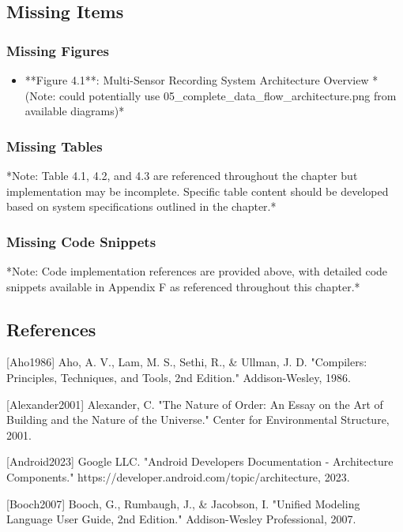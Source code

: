 \documentclass[12pt,a4paper]{article}
\begin{document}
\subsection{Missing Items}

\subsubsection{Missing Figures}

\begin{itemize}
\item **Figure 4.1**: Multi-Sensor Recording System Architecture Overview *(Note: could potentially use
  05\_complete\_data\_flow\_architecture.png from available diagrams)*

\end{itemize}
\subsubsection{Missing Tables}

*Note: Table 4.1, 4.2, and 4.3 are referenced throughout the chapter but implementation may be incomplete. Specific
table content should be developed based on system specifications outlined in the chapter.*

\subsubsection{Missing Code Snippets}

*Note: Code implementation references are provided above, with detailed code snippets available in Appendix F as
referenced throughout this chapter.*

\subsection{References}

[Aho1986] Aho, A. V., Lam, M. S., Sethi, R., \& Ullman, J. D. "Compilers: Principles, Techniques, and Tools, 2nd
Edition." Addison-Wesley, 1986.

[Alexander2001] Alexander, C. "The Nature of Order: An Essay on the Art of Building and the Nature of the Universe."
Center for Environmental Structure, 2001.

[Android2023] Google LLC. "Android Developers Documentation - Architecture
Components." https://developer.android.com/topic/architecture, 2023.

[Booch2007] Booch, G., Rumbaugh, J., \& Jacobson, I. "Unified Modeling Language User Guide, 2nd Edition." Addison-Wesley
Professional, 2007.
\end{document}

